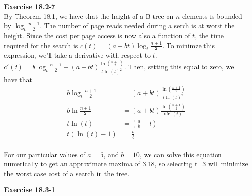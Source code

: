 \documentclass{article}
\begin{document}
\noindent\textbf{Exercise 18.2-7}\\
By Theorem 18.1, we have that the height  of a B-tree on $n$ elements is bounded by $\log_t \frac{n+1}{2}$. The number of page reads needed during a serch is at worst the height. Since the cost per page access is now also a function of $t$, the time required for the search is $c(t) = (a+bt)\log_t \frac{n+1}{2}$. To minimze this expression, we'll take a derivative with respect to $t$. $c'(t) = b \log_t\frac{n+1}{2} - (a+bt) \frac{\ln\left(\frac{n+1}{2}\right)}{t \ln(t)^2}$. Then, setting this equal to zero, we have that 
\begin{align*}
b \log_t\frac{n+1}{2} &= (a+bt) \frac{\ln\left(\frac{n+1}{2}\right)}{t \ln(t)^2}\\
b \ln\frac{n+1}{2} &= (a+bt) \frac{\ln\left(\frac{n+1}{2}\right)}{t \ln(t)}\\
t\ln(t) &=(\frac{a}{b} +t)\\
t(\ln(t)-1) &= \frac{a}{b}\\
\end{align*}

For our particular values of $a=5$, and $b=10$, we can solve this equation numerically to get an approximate maxima of 3.18, so selecting t=3 will minimize the worst case cost of a search in the tree.

\noindent\textbf{Exercise 18.3-1}\\


\end{document}
